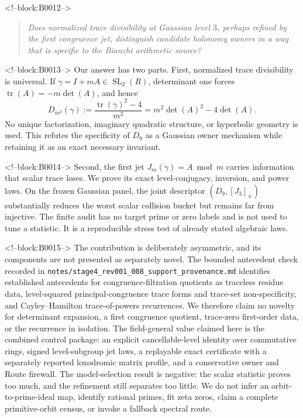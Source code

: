 \documentclass[11pt,a4paper]{article}
\theoremstyle{definition}
\theoremstyle{remark}
\newcommand{\SL}{\operatorname{SL}}
\newcommand{\tr}{\operatorname{tr}}
\begin{document}
<!--block:B0012-->
\begin{quote}
\emph{Does normalized trace divisibility at Gaussian level \(3\), perhaps refined by the first congruence jet, distinguish candidate holonomy owners in a way that is specific to the Bianchi arithmetic source?}
\end{quote}

<!--block:B0013-->
Our answer has two parts. First, normalized trace divisibility is universal. If \(\gamma=I+mA\in\SL_2(R)\), determinant one forces \(\tr(A)=-m\det(A)\), and hence
\[
 D_{m^2}(\gamma):=\frac{\tr(\gamma)^2-4}{m^2}
 =m^2\det(A)^2-4\det(A).
\]
No unique factorization, imaginary quadratic structure, or hyperbolic geometry is used. This refutes the specificity of \(D_9\) as a Gaussian owner mechanism while retaining it as an exact necessary invariant.

<!--block:B0014-->
Second, the first jet \(J_m(\gamma)=A\bmod m\) carries information that scalar trace loses. We prove its exact level-conjugacy, inversion, and power laws. On the frozen Gaussian panel, the joint descriptor \((D_9,[J_3]_{\pm})\) substantially reduces the worst scalar collision bucket but remains far from injective. The finite audit has no target prime or zero labels and is not used to tune a statistic. It is a reproducible stress test of already stated algebraic laws.

<!--block:B0015-->
The contribution is deliberately asymmetric, and its components are not presented as separately novel. The bounded antecedent check recorded in \texttt{notes/stage4\_rev001\_008\_support\_provenance.md} identifies established antecedents for congruence-filtration quotients as traceless residue data, level-squared principal-congruence trace forms and trace-set non-specificity, and Cayley--Hamilton trace-of-powers recurrences. We therefore claim no novelty for determinant expansion, a first congruence quotient, trace-zero first-order data, or the recurrence in isolation. The field-general value claimed here is the combined control package: an explicit cancellable-level identity over commutative rings, signed level-subgroup jet laws, a replayable exact certificate with a separately reported loxodromic matrix profile, and a conservative owner and Route firewall. The model-selection result is negative: the scalar statistic proves too much, and the refinement still separates too little. We do not infer an orbit-to-prime-ideal map, identify rational primes, fit zeta zeros, claim a complete primitive-orbit census, or invoke a fallback spectral route.
\end{document}
